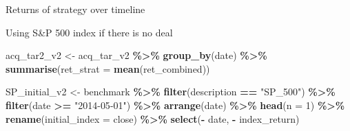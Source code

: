 \documentclass[
]{article}
\newenvironment{Shaded}{\begin{snugshade}}{\end{snugshade}}
\newcommand{\DataTypeTok}[1]{\textcolor[rgb]{0.13,0.29,0.53}{#1}}
\newcommand{\DecValTok}[1]{\textcolor[rgb]{0.00,0.00,0.81}{#1}}
\newcommand{\KeywordTok}[1]{\textcolor[rgb]{0.13,0.29,0.53}{\textbf{#1}}}
\newcommand{\NormalTok}[1]{#1}
\newcommand{\OperatorTok}[1]{\textcolor[rgb]{0.81,0.36,0.00}{\textbf{#1}}}
\newcommand{\StringTok}[1]{\textcolor[rgb]{0.31,0.60,0.02}{#1}}
\begin{document}
Returns of strategy over timeline

Using S\&P 500 index if there is no deal

\begin{Shaded}
\begin{Highlighting}[]
\NormalTok{acq\_tar2\_v2 \textless{}{-}}\StringTok{ }\NormalTok{acq\_tar\_v2 }\OperatorTok{\%\textgreater{}\%}
\StringTok{  }\KeywordTok{group\_by}\NormalTok{(date) }\OperatorTok{\%\textgreater{}\%}
\StringTok{  }\KeywordTok{summarise}\NormalTok{(}\DataTypeTok{ret\_strat =} \KeywordTok{mean}\NormalTok{(ret\_combined))}

\NormalTok{SP\_initial\_v2 \textless{}{-}}\StringTok{ }\NormalTok{benchmark }\OperatorTok{\%\textgreater{}\%}
\StringTok{  }\KeywordTok{filter}\NormalTok{(description }\OperatorTok{==}\StringTok{ "SP\_500"}\NormalTok{) }\OperatorTok{\%\textgreater{}\%}
\StringTok{  }\KeywordTok{filter}\NormalTok{(date }\OperatorTok{\textgreater{}=}\StringTok{ "2014{-}05{-}01"}\NormalTok{) }\OperatorTok{\%\textgreater{}\%}
\StringTok{  }\KeywordTok{arrange}\NormalTok{(date) }\OperatorTok{\%\textgreater{}\%}
\StringTok{  }\KeywordTok{head}\NormalTok{(}\DataTypeTok{n =} \DecValTok{1}\NormalTok{) }\OperatorTok{\%\textgreater{}\%}
\StringTok{  }\KeywordTok{rename}\NormalTok{(}\DataTypeTok{initial\_index =}\NormalTok{ close) }\OperatorTok{\%\textgreater{}\%}
\StringTok{  }\KeywordTok{select}\NormalTok{(}\OperatorTok{{-}}\StringTok{ }\NormalTok{date, }\OperatorTok{{-}}\StringTok{ }\NormalTok{index\_return)}


\end{Highlighting}
\end{Shaded}
\end{document}
